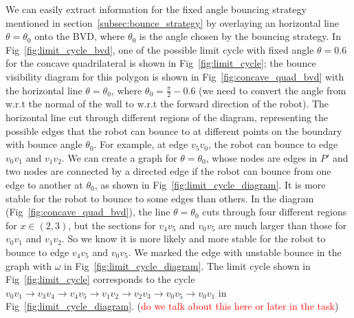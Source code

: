 \documentclass[letterpaper, 10 pt, conference]{ieeeconf}  %
\begin{document}
We can easily extract information for the fixed angle bouncing strategy mentioned in section~\ref{subsec:bounce_strategy} by overlaying an horizontal line $\theta = \theta_0$ onto the BVD, where $\theta_0$ is the angle chosen by the bouncing strategy. In Fig~\ref{fig:limit_cycle_bvd}, one of the possible limit cycle with fixed angle $\theta = 0.6$ for the concave quadrilateral is shown in Fig~\ref{fig:limit_cycle}; the bounce visibility diagram for this polygon is shown in Fig~\ref{fig:concave_quad_bvd} with the horizontal line $\theta = \theta_0$, where $\theta_0 = \frac{\pi}{2}-0.6$ (we need to convert the angle from w.r.t the normal of the wall to w.r.t the forward direction of the robot). The horizontal line cut through different regions of the diagram, representing the possible edges that the robot can bounce to at different points on the boundary with bounce angle $\theta_0$. For example, at edge $v_5v_0$, the robot can bounce to edge $v_0v_1$ and $v_1v_2$. We can create a graph for $\theta = \theta_0$, whose nodes are edges in $P'$ and two nodes are connected by a directed edge if the robot can bounce from one edge to another at $\theta_0$, as shown in Fig~\ref{fig:limit_cycle_diagram}. It is more stable for the robot to bounce to some edges than others. In the diagram (Fig~\ref{fig:concave_quad_bvd}), the line $\theta = \theta_0$ cuts through four different regions for $x \in (2, 3)$, but the sections for $v_4v_5$ and $v_0v_5$ are much larger than those for $v_0v_1$ and $v_1v_2$. So we know it is more likely and more stable for the robot to bounce to edge $v_4v_5$ and $v_0v_5$. We marked the edge with unstable bounce in the graph with $\omega$ in Fig~\ref{fig:limit_cycle_diagram}. The limit cycle shown in Fig~\ref{fig:limit_cycle} corresponds to the cycle $v_0v_1\rightarrow v_3v_4\rightarrow v_4v_5 \rightarrow v_1v_2 \rightarrow v_2v_3 \rightarrow v_0v_5 \rightarrow v_0v_1$ in Fig~\ref{fig:limit_cycle_diagram}.
(\textcolor{red}{do we talk about this here or later in the task})
\end{document}
